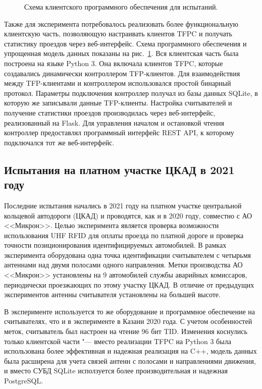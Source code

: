 \begin{figure}[ht]
  \caption{Схема клиентского программного обеспечения для испытаний.}
  \label{fig:ch5_kazan2020_client}
\end{figure}

Также для эксперимента потребовалось реализовать более функциональную клиентскую часть, позволяющую настраивать клиентов TFPC и получать статистику проездов через веб-интерфейс. Схема программного обеспечения и упрощенная модель данных показаны на рис.~\ref{fig:ch5_kazan2020_client}. Вся клиентская часть была построена на языке Python 3. Она включала клиентов TFPC, которые создавались динамически контроллером TFP-клиентов. Для взаимодействия между TFP-клиентами и контроллером использовался простой бинарный протокол. Параметры подключения контроллер получал из базы данных SQLite, в которую же записывали данные TFP-клиенты. Настройка считывателей и получение статистики проездов производилась через веб-интерфейс, реализованный на Flask. Для управления началом и остановкой чтения контроллер предоставлял программный интерфейс REST API, к которому подключался тот же веб-интерфейс.


\subsection{Испытания на платном участке ЦКАД в 2021 году}\label{sec:ch5_experiments_ckad2021}

Последние испытания начались в 2021 году на платном участке центральной кольцевой автодороги (ЦКАД) и проводятся, как и в 2020 году, совместно с АО <<Микрон>>. Целью эксперимента является проверка возможности использования UHF RFID для оплаты проезда по платной дороге и проверка точности позиционирования идентифицируемых автомобилей. В рамках эксперимента оборудована одна точка идентификации считывателем с четырьмя антеннами над двумя полосами одного направления. Метки производства АО <<Микрон>> установлены на 9 автомобилей службы аварийных комиссаров, периодически проезжающих по этому участку ЦКАД. В отличие от предыдущих экспериментов антенны считывателя установлены на большей высоте.

В эксперименте используется то же оборудование и программное обеспечение на считывателях, что и в эксперименте в Казани 2020 года. С учетом особенностей меток, считыватель был настроен на чтение 96 бит TID. Изменения коснулись только клиентской части "--- вместо реализации TFPC на Python 3 была использована более эффективная и надежная реализация на C++, модель данных была расширена для учета связей антенн с полосами и направлениями движения, и вместо СУБД SQLite исползуется более производительная и надежная PostgreSQL.

